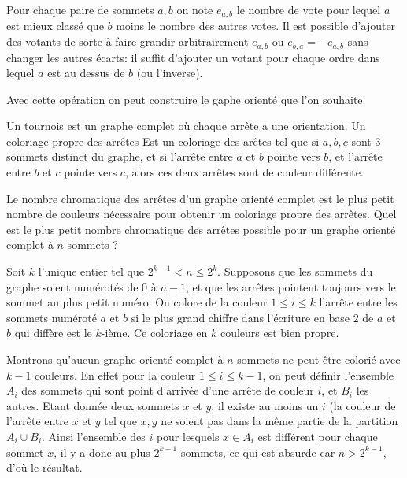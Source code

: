 \begin{sol}
Pour chaque paire de sommets $a,b$ on note $e_{a,b}$ le nombre de vote pour lequel $a$ est mieux classé que $b$ moins le nombre des autres votes. Il est possible d'ajouter des votants de sorte à faire grandir arbitrairement $e_{a,b}$ ou $e_{b,a}=-e_{a,b}$ sans changer les autres écarts: il suffit d'ajouter un votant pour chaque ordre dans lequel $a$ est au dessus de $b$ (ou l'inverse).

\medskip

Avec cette opération on peut construire le gaphe orienté que l'on souhaite.
\end{sol}


\begin{exo}
Un tournois est un graphe complet où chaque arrête a une orientation. Un coloriage propre des arrêtes Est un coloriage des arêtes tel que si $a,b,c$ sont 3 sommets distinct du graphe, et si l'arrête entre $a$ et $b$ pointe vers $b$, et l'arrête entre $b$ et $c$ pointe vers $c$, alors ces deux arrêtes sont de couleur différente.

Le nombre chromatique des arrêtes d'un graphe orienté complet est le plus petit nombre de couleurs nécessaire pour obtenir un coloriage propre des arrêtes. Quel est le plus petit nombre chromatique des arrêtes possible pour un graphe orienté complet à $n$ sommets ?
\end{exo}

\begin{sol}

Soit $k$ l'unique entier tel que $2^{k-1}<n\leq 2^k$. Supposons que les sommets du graphe soient numérotés de $0$ à $n-1$, et que les arrêtes pointent toujours vers le sommet au plus petit numéro. On colore de la couleur $1\leq i\leq k$ l'arrête entre les sommets numéroté $a$ et $b$ si le plus grand chiffre dans l'écriture en base $2$ de $a$ et $b$ qui diffère est le $k$-ième. Ce coloriage en $k$ couleurs est bien propre.

\medskip

Montrons qu'aucun graphe orienté complet à $n$ sommets ne peut être colorié avec $k-1$ couleurs. En effet pour la couleur $1\leq i\leq k-1$, on peut définir l'ensemble $A_i$ des sommets qui sont point d'arrivée d'une arrête de couleur $i$, et $B_i$ les autres. Etant donnée deux sommets $x$ et $y$, il existe au moins un $i$ (la couleur de l'arrête entre $x$ et $y$ tel que $x,y$ ne soient pas dans la même partie de la partition $A_i\cup B_i$. Ainsi l'ensemble des $i$ pour lesquels $x\in A_i$ est différent pour chaque sommet $x$, il y a donc au plus $2^{k-1}$ sommets, ce qui est absurde car $n>2^{k-1}$, d'où le résultat.

\end{sol}

